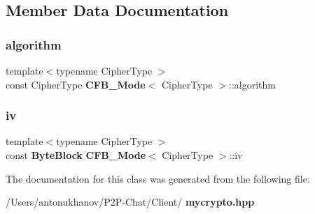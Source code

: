 \subsection{Member Data Documentation}
\mbox{\label{class_c_f_b___mode_a98305e12bef9c0e5e07b7d2914dc8f52}} 
\subsubsection{algorithm}
{\footnotesize\ttfamily template$<$typename Cipher\+Type $>$ \\
const Cipher\+Type \textbf{ C\+F\+B\+\_\+\+Mode}$<$ Cipher\+Type $>$\+::algorithm\hspace{0.3cm}{\ttfamily [private]}}

\mbox{\label{class_c_f_b___mode_a894c65328ecaf2095dd283bc263620fe}} 
\subsubsection{iv}
{\footnotesize\ttfamily template$<$typename Cipher\+Type $>$ \\
const \textbf{ Byte\+Block} \textbf{ C\+F\+B\+\_\+\+Mode}$<$ Cipher\+Type $>$\+::iv\hspace{0.3cm}{\ttfamily [private]}}



The documentation for this class was generated from the following file\+:\begin{DoxyCompactItemize}
\item 
/\+Users/antonukhanov/\+P2\+P-\/\+Chat/\+Client/\textbf{ mycrypto.\+hpp}\end{DoxyCompactItemize}
